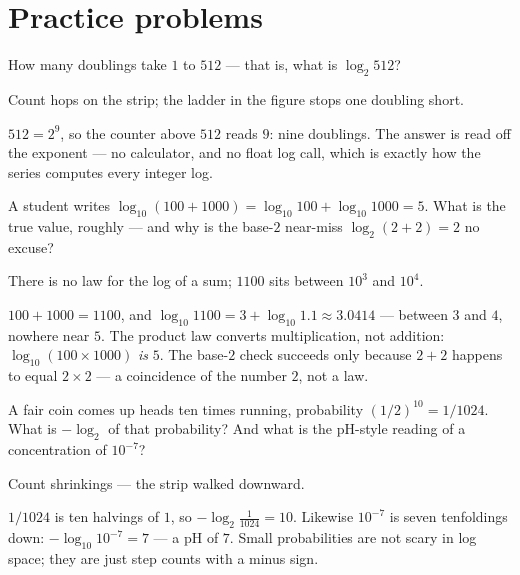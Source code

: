 \section*{Practice problems}

\begin{problem}
How many doublings take $1$ to $512$ — that is, what is
$\log_2 512$?
\begin{hint}
Count hops on the strip; the ladder in the figure stops one doubling
short.
\end{hint}
\begin{solution}
$512 = 2^9$, so the counter above $512$ reads $9$: nine doublings.
The answer is read off the exponent — no calculator, and no float
log call, which is exactly how the series computes every integer log.
\end{solution}
\end{problem}

\begin{problem}
A student writes
$\log_{10}(100 + 1000) = \log_{10} 100 + \log_{10} 1000 = 5$.
What is the true value, roughly — and why is the base-$2$ near-miss
$\log_2(2 + 2) = 2$ no excuse?
\begin{hint}
There is no law for the log of a sum; $1100$ sits between $10^3$
and $10^4$.
\end{hint}
\begin{solution}
$100 + 1000 = 1100$, and
$\log_{10} 1100 = 3 + \log_{10} 1.1 \approx 3.0414$ — between $3$ and
$4$, nowhere near $5$. The product law converts multiplication, not
addition: $\log_{10}(100 \times 1000)$ \emph{is} $5$. The base-$2$
check succeeds only because $2 + 2$ happens to equal $2 \times 2$ —
a coincidence of the number $2$, not a law.
\end{solution}
\end{problem}

\begin{problem}
A fair coin comes up heads ten times running, probability
$(1/2)^{10} = 1/1024$. What is $-\log_2$ of that probability? And
what is the pH-style reading of a concentration of $10^{-7}$?
\begin{hint}
Count shrinkings — the strip walked downward.
\end{hint}
\begin{solution}
$1/1024$ is ten halvings of $1$, so
$-\log_2 \tfrac{1}{1024} = 10$. Likewise $10^{-7}$ is seven
tenfoldings down: $-\log_{10} 10^{-7} = 7$ — a pH of $7$. Small
probabilities are not scary in log space; they are just step counts
with a minus sign.
\end{solution}
\end{problem}

